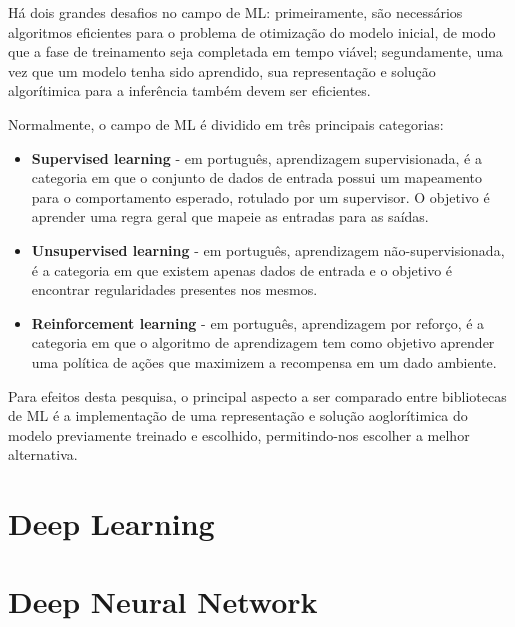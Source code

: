 Há dois grandes desafios no campo de ML: primeiramente, são necessários algoritmos eficientes para o problema de otimização do modelo inicial, de modo que a fase de treinamento seja completada em tempo viável; segundamente, uma vez que um modelo tenha sido aprendido, sua representação e solução algorítimica para a inferência também devem ser eficientes. \cite{alpaydin2020introduction} \cite{brief_introduction_to_ml}

Normalmente, o campo de ML é dividido em três principais categorias:

\begin{itemize}
  \item \textbf{Supervised learning} - em português, aprendizagem supervisionada, é a categoria em que o conjunto de dados de entrada possui um mapeamento para o comportamento esperado, rotulado por um supervisor. O objetivo é aprender uma regra geral que mapeie as entradas para as saídas. \cite{alpaydin2020introduction}
  \item \textbf{Unsupervised learning} - em português, aprendizagem não-supervisionada, é a categoria em que existem apenas dados de entrada e o objetivo é encontrar regularidades presentes nos mesmos. \cite{alpaydin2020introduction}
  \item \textbf{Reinforcement learning} - em português, aprendizagem por reforço, é a categoria em que o algoritmo de aprendizagem tem como objetivo aprender uma política de ações que maximizem a recompensa em um dado ambiente. \cite{alpaydin2020introduction}
\end{itemize}

Para efeitos desta pesquisa, o principal aspecto a ser comparado entre bibliotecas de ML é a implementação de uma representação e solução aoglorítimica do modelo previamente treinado e escolhido, permitindo-nos escolher a melhor alternativa.

\section{Deep Learning}%
\label{ft_dl}

\section{Deep Neural Network}%
\label{ft_dnn}